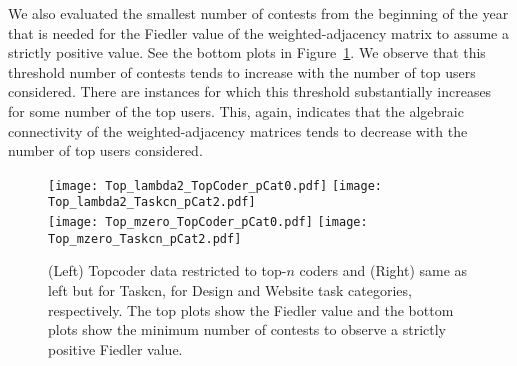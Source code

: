 We also evaluated the smallest number of contests from the beginning of the year that is needed for the Fiedler value of the weighted-adjacency matrix to assume a strictly positive value. See the bottom plots in Figure~\ref{fig:TopCoder}. We observe that this threshold number of contests tends to increase with the number of top users considered. There are instances for which this threshold substantially increases for some number of the top users. This, again, indicates that the algebraic connectivity of the weighted-adjacency matrices tends to decrease with the number of top users considered.

\begin{figure}[t]
\centering
\vspace*{-1.8cm}
\texttt{[image: Top\_lambda2\_TopCoder\_pCat0.pdf]}\hspace*{-0.2cm}
\texttt{[image: Top\_lambda2\_Taskcn\_pCat2.pdf]}\hspace*{-0.2cm}
\\\vspace*{-4cm}
\texttt{[image: Top\_mzero\_TopCoder\_pCat0.pdf]}\hspace*{-0.2cm}
\texttt{[image: Top\_mzero\_Taskcn\_pCat2.pdf]}\hspace*{-0.2cm}
\vspace*{-1.5cm}
\caption{(Left) Topcoder data restricted to top-$n$ coders and (Right) same as left but for Taskcn, for Design and Website task categories, respectively. The top plots show the Fiedler value and the bottom plots show the minimum number of contests to observe a strictly positive Fiedler value.}
\label{fig:TopCoder}
\end{figure}


